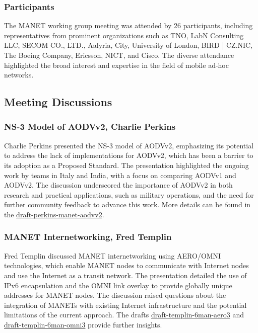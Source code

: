 \documentclass{article}
\begin{document}
\subsubsection{Participants}
The MANET working group meeting was attended by 26 participants, including representatives from prominent organizations such as TNO, LabN Consulting LLC, SECOM CO., LTD., Aalyria, City, University of London, BIRD | CZ.NIC, The Boeing Company, Ericsson, NICT, and Cisco. The diverse attendance highlighted the broad interest and expertise in the field of mobile ad-hoc networks.

\subsection{Meeting Discussions}

\subsubsection{NS-3 Model of AODVv2, Charlie Perkins}
Charlie Perkins presented the NS-3 model of AODVv2, emphasizing its potential to address the lack of implementations for AODVv2, which has been a barrier to its adoption as a Proposed Standard. The presentation highlighted the ongoing work by teams in Italy and India, with a focus on comparing AODVv1 and AODVv2. The discussion underscored the importance of AODVv2 in both research and practical applications, such as military operations, and the need for further community feedback to advance this work. More details can be found in the \href{https://datatracker.ietf.org/doc/draft-perkins-manet-aodvv2/}{draft-perkins-manet-aodvv2}.

\subsubsection{MANET Internetworking, Fred Templin}
Fred Templin discussed MANET internetworking using AERO/OMNI technologies, which enable MANET nodes to communicate with Internet nodes and use the Internet as a transit network. The presentation detailed the use of IPv6 encapsulation and the OMNI link overlay to provide globally unique addresses for MANET nodes. The discussion raised questions about the integration of MANETs with existing Internet infrastructure and the potential limitations of the current approach. The drafts \href{https://datatracker.ietf.org/doc/draft-templin-6man-aero3/}{draft-templin-6man-aero3} and \href{https://datatracker.ietf.org/doc/draft-templin-6man-omni3/}{draft-templin-6man-omni3} provide further insights.
\end{document}
